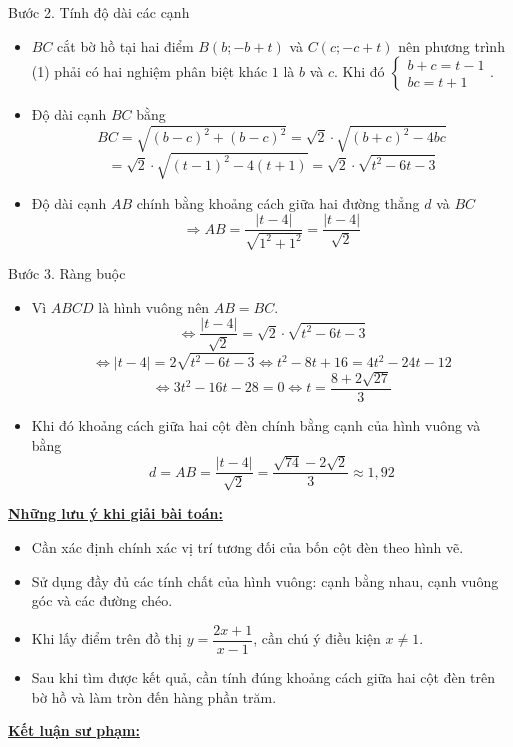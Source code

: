 \documentclass[12pt,a4paper,oneside]{book}
\theoremstyle{theorem}
\theoremstyle{definition}
\begin{document}
Bước 2. Tính độ dài các cạnh
\begin{itemize}
    \item $BC$ cắt bờ hồ tại hai điểm $B(b; -b+t)$ và $C(c; -c+t)$ nên phương trình (1) phải có hai nghiệm phân biệt khác $1$ là $b$ và $c$. Khi đó $\begin{cases} b + c = t - 1 \\ bc = t + 1 \end{cases}$.
    \item Độ dài cạnh $BC$ bằng
    $$BC = \sqrt{(b-c)^2 + (b-c)^2} = \sqrt{2} \cdot \sqrt{(b+c)^2 - 4bc}$$
    $$ = \sqrt{2} \cdot \sqrt{(t-1)^2 - 4(t+1)}= \sqrt{2} \cdot \sqrt{t^2 - 6t - 3}$$
    \item Độ dài cạnh $AB$ chính bằng khoảng cách giữa hai đường thẳng $d$ và $BC$
    $$\Rightarrow AB = \dfrac{|t-4|}{\sqrt{1^2 + 1^2}} = \dfrac{|t-4|}{\sqrt{2}}$$
\end{itemize}

Bước 3. Ràng buộc
\begin{itemize}
    \item Vì $ABCD$ là hình vuông nên $AB = BC$.
    $$\Leftrightarrow \dfrac{|t-4|}{\sqrt{2}} = \sqrt{2} \cdot \sqrt{t^2 - 6t - 3}$$
    $$\Leftrightarrow |t-4| = 2\sqrt{t^2 - 6t - 3} \Leftrightarrow t^2 - 8t + 16 = 4t^2 - 24t - 12$$
    $$\Leftrightarrow 3t^2 - 16t - 28 = 0 \Leftrightarrow t = \dfrac{8 + 2\sqrt{27}}{3}$$
    \item Khi đó khoảng cách giữa hai cột đèn chính bằng cạnh của hình vuông và bằng
    $$d = AB = \dfrac{|t-4|}{\sqrt{2}} = \dfrac{\sqrt{74} - 2\sqrt{2}}{3} \approx 1,92$$
\end{itemize}

        \textbf{\underline{Những lưu ý khi giải bài toán:}}
        \begin{itemize}
            \item Cần xác định chính xác vị trí tương đối của bốn cột đèn theo hình vẽ.
            \item Sử dụng đầy đủ các tính chất của hình vuông: cạnh bằng nhau, cạnh vuông góc và các đường chéo.
            \item Khi lấy điểm trên đồ thị \(y=\dfrac{2x+1}{x-1}\), cần chú ý điều kiện \(x\ne1\).
            \item Sau khi tìm được kết quả, cần tính đúng khoảng cách giữa hai cột đèn trên bờ hồ và làm tròn đến hàng phần trăm.
        \end{itemize}
        
        \textbf{\underline{Kết luận sư phạm:}}
\end{document}
